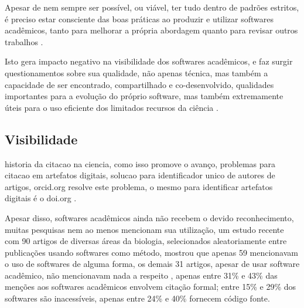 Apesar de nem sempre ser possível, ou viável, ter tudo dentro de
padrões estritos, é preciso estar consciente das boas práticas ao
produzir e utilizar softwares acadêmicos, tanto para melhorar a própria
abordagem quanto para revisar outros trabalhos \cite{wilson2014best}.

Isto gera impacto negativo na visibilidade dos softwares acadêmicos, e faz
surgir questionamentos sobre sua qualidade, não apenas técnica, mas também a
capacidade de ser encontrado, compartilhado e co-desenvolvido, qualidades
importantes para a evolução do próprio software, mas também extremamente úteis
para o uso eficiente dos limitados recursos da ciência \cite{howison2013,
katz2014transitive}.

\subsection{Visibilidade}


historia da citacao na ciencia, como isso promove o avanço, problemas para
citacao em artefatos digitais, solucao para identificador unico de autores de
artigos, orcid.org resolve este problema, o mesmo para identificar artefatos
digitais é o doi.org \cite{allen2014credit}.

Apesar disso, softwares acadêmicos ainda não recebem o devido reconhecimento,
muitas pesquisas nem ao menos mencionam sua utilização, um estudo recente com
90 artigos de diversas áreas da biologia, selecionados aleatoriamente entre
publicações usando softwares como método, mostrou que apenas 59 mencionavam o
uso de softwares de alguma forma, os demais 31 artigos, apesar de usar software
acadêmico, não mencionavam nada a respeito \cite{howison2016software},
apenas entre 31\% e
43\% das menções aos softwares acadêmicos envolvem citação formal; entre 15\% e
29\% dos softwares são inacessíveis, apenas entre 24\% e 40\% fornecem código
fonte.

